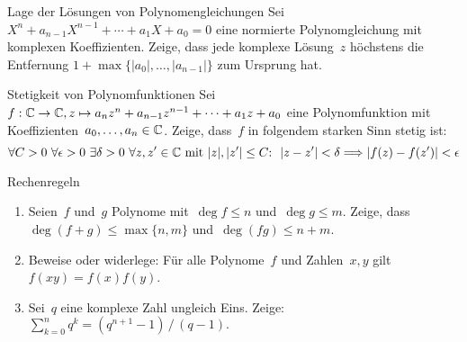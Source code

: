 \documentclass{algblatt}
\begin{document}
\vspace*{-1.5cm}

\begin{aufgabe}{Lage der Lösungen von Polynomengleichungen}
Sei $X^n + a_{n - 1} X^{n - 1} + \cdots + a_1 X + a_0 = 0$ eine normierte
Polynomgleichung mit komplexen Koeffizienten. Zeige, dass jede komplexe
Lösung~$z$ höchstens die Entfernung
$1+\max\{|a_0|,\ldots,|a_{n-1}|\}$ zum Ursprung hat.
\end{aufgabe}

\begin{aufgabe}{Stetigkeit von Polynomfunktionen}
Sei~$f:\mathbb{C}\to\mathbb{C}, z \mapsto a_nz^n + a_{n-1}z^{n-1} + \cdots + a_1z + a_0$ eine
Polynomfunktion mit Koeffizienten~$a_0,\ldots,a_n \in \mathbb{C}$. Zeige, dass~$f$ in
folgendem starken Sinn stetig ist:
\[
  \forall C > 0\ 
  \forall \epsilon > 0\ 
  \exists \delta > 0 \ 
  \forall \text{$z,z' \in \CC$ mit $|z|,|z'| \leq C$}{:}\ \ 
  |z-z'| < \delta \Longrightarrow |f(z) - f(z')| < \epsilon
\]
\vspace{-2.0em}
\end{aufgabe}

\begin{aufgabe}{Rechenregeln}
\begin{enumerate}
\item Seien~$f$ und~$g$ Polynome mit~$\deg f \leq n$ und~$\deg g \leq m$.
Zeige, dass $\deg(f+g) \leq \max\{n,m\}$ und~$\deg(fg) \leq n+m$.
\item Beweise oder widerlege: Für alle Polynome~$f$ und Zahlen~$x,y$ gilt~$f(xy) = f(x) f(y)$.
\item Sei~$q$ eine komplexe Zahl ungleich Eins. Zeige: $\sum_{k=0}^n q^k =
(q^{n+1}-1)\,/\,(q-1).$
\end{enumerate}
\end{aufgabe}
\end{document}
